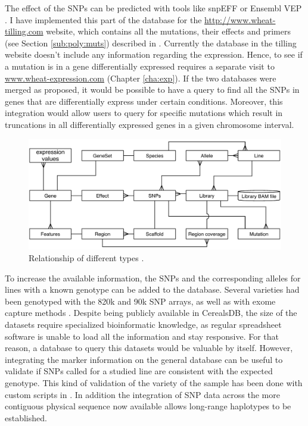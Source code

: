 The effect of the SNPs can be predicted with tools like snpEFF \citep{Cingolani2012} or Ensembl VEP \citep{Mclaren2016}. 
I have implemented this part of the database for the \url{http://www.wheat-tilling.com} website, which contains all the mutations, their effects and primers (see Section \ref{sub:poly:muts}) described in \citet{Krasileva2016}. 
Currently the database in the tilling website doesn't include any information regarding the expression. 
Hence, to see if a mutation is in a gene differentially expressed requires a separate visit to \url{www.wheat-expression.com} (Chapter \ref{cha:exp}). 
If the two databases were merged as proposed, it would be possible to have a query to find all the SNPs in genes that are differentially express under certain conditions.
Moreover, this integration would allow users to query for specific mutations which result in truncations in all differentially expressed genes in a given chromosome interval.  

\begin{figure}[b]
\includegraphics[width=1\textwidth]{Conclusions/Figures/IntegratingExperiments.pdf}
\caption{Relationship of different types .}
\label{fig:discussion:sequencingExperimentsTables}
\end{figure}

To increase the available information, the SNPs and the corresponding alleles for lines with a known genotype  can be added to the database. 
Several varieties had been genotyped with the 820k \citep{Winfield2016} and 90k \citep{Wang2014} SNP arrays, as well as with exome capture methods \citep{Jordan2015}.
Despite being publicly available in CerealsDB, the size of the datasets require specialized bioinformatic knowledge, as regular spreadsheet software is unable to load all the information and stay responsive. 
For that reason, a database to query this datasets would be valuable by itself. 
However, integrating the marker information on the general database can be useful to validate if SNPs called for a studied line are consistent with the expected genotype. 
This kind of validation of the variety of the sample has been done with custom scripts in \citep{Hubbard2015}.
In addition the integration of SNP data across the more contiguous physical sequence now available allows long-range haplotypes to be established. 

